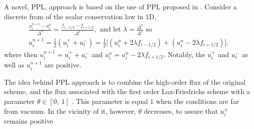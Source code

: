 %
A novel, \ac{PPL}, approach is based on the use of \ac{PPL} proposed in \citet{Hu:2013}.
%
Consider a discrete from of the scalar conservation law in $1$D,
\begin{equation}
\begin{aligned}
\frac{u_{i}^{n+1} - u_{i}^{n}}{\Delta^0} = \frac{f_{i-1/2} - f_{i+1/2}}{\Delta^1}, \text{ and let } \lambda = \frac{\Delta^0}{\Delta^1} \text{ so } \\
u_{i}^{n+1} = \frac{1}{2}(u_{i}^{+} + u_{i}^{-}) = \frac{1}{2}\Big[ (u_{i}^{n} + 2\lambda f_{i-1/2}) + (u_{i}^{n} - 2\lambda f_{i+1/2})\Big].
\end{aligned}
\end{equation}
where then $u_{i}^{n+1} = u_{i}^{+} + u_{i}^{-}$ and $u_{i}^{n} = u_{i}^{n} - 2\lambda f_{i+1/2}$. Notably, the $u_{i}^{+}$ and $u_{i}^{-}$ as well as $u_{i}^{n+1}$ are positive. 

The idea behind \ac{PPL} approach is to combine the 
high-order flux of the original scheme,
and the flux associated with the first order Lax-Friedrichs scheme
with a parameter $\theta\in[0,\:1]$ \citet{Hu:2013,Zhang:2010}. 
This parameter is equal $1$ when the conditions
are far from vacuum. In the vicinity of it, however, 
$\theta$ decreases, to assure that $u_{i}^{\pm}$ remains positive 

